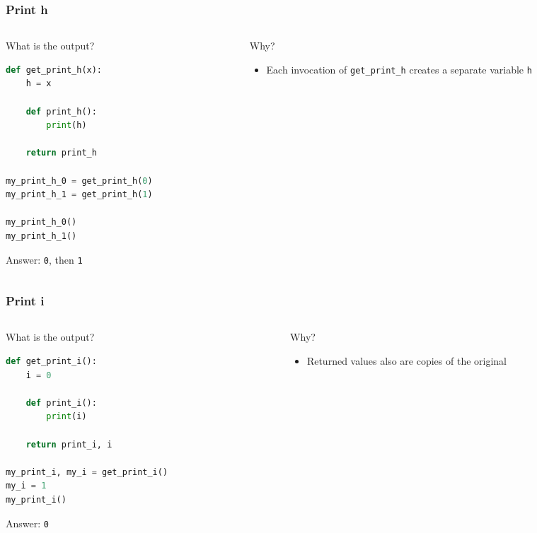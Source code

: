 \documentclass[aspectratio=169,hyperref={bookmarks=false,urlcolor=blue,colorlinks=true},10pt]{beamer}
\begin{document}
\begin{frame}[fragile]
  \frametitle{Print h}

  \begin{columns}[t]
    \begin{column}{0.50\textwidth}
      What is the output?

      \begin{lstlisting}[language=Python]
def get_print_h(x):
    h = x

    def print_h():
        print(h)

    return print_h

my_print_h_0 = get_print_h(0)
my_print_h_1 = get_print_h(1)

my_print_h_0()
my_print_h_1()
      \end{lstlisting}

      \pause

      Answer: \texttt{0}, then \texttt{1}
    \end{column}
    \begin{column}{0.40\textwidth}
      Why?

      \pause

      \begin{itemize}
      \item Each invocation of \texttt{get\_print\_h} creates a separate variable \texttt{h}
      \end{itemize}
    \end{column}
  \end{columns}
\end{frame}

\begin{frame}[fragile]
  \frametitle{Print i}

  \begin{columns}[t]
    \begin{column}{0.55\textwidth}
      What is the output?

      \begin{lstlisting}[language=Python]
def get_print_i():
    i = 0

    def print_i():
        print(i)

    return print_i, i

my_print_i, my_i = get_print_i()
my_i = 1
my_print_i()
      \end{lstlisting}

      \pause

      Answer: \texttt{0}
    \end{column}
    \begin{column}{0.35\textwidth}
      Why?

      \pause

      \begin{itemize}
      \item Returned values also are copies of the original
      \end{itemize}
    \end{column}
  \end{columns}
\end{frame}
\end{document}
